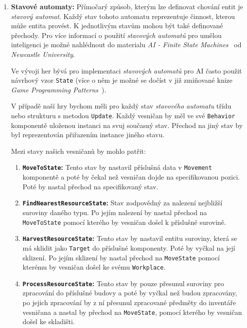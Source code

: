 \begin{enumerate}
    \item \textbf{Stavové automaty:} Přímočarý způsob, kterým lze definovat chování entit je \textit{stavový automat}. Každý stav tohoto automatu reprezentuje činnost, kterou může entita provést. K jednotlivým stavům mohou být také definované přechody. Pro více informací o použití \textit{stavových automatů} pro umělou inteligenci je možné nahlédnout do materialu \textit{AI - Finite State Machines}~\cite{AIStateMachines} od \textit{Newcastle University}.

    Ve vývoji her bývá pro implementaci \textit{stavových automatů} pro AI často použit návrhový vzor \texttt{State} (více o něm je možné se dočíst v již zmiňované knize \textit{Game Programming Patterns}~\cite{nystrom2014game}).

    V případě naší hry bychom měli pro každý stav \textit{stavového automatu} třídu nebo strukturu s metodou \texttt{Update}. Každý vesničan by měl ve své \texttt{Behavior} komponentě uloženou instanci na svuj současný stav. Přechod na jiný stav by byl reprezentován přiřazením instance jiného stavu.

    Mezi stavy našich vesničanů by mohlo patřit:
    \begin{enumerate}
        \item \textbf{\texttt{MoveToState}:} Tento stav by nastavil příslušná data v \texttt{Movement} komponentě a poté by čekal než vesničan dojde na specifikovanou pozici. Poté by nastal přechod na specifikovaný stav.

        \item \textbf{\texttt{FindNearestResourceState}:} Stav zodpovědný za nalezení nejbližší suroviny daného typu. Po jejím nalezení by nastal přechod na \texttt{MoveToState} pomocí kterého by vesničan došel k příslušné surovině.

        \item \textbf{\texttt{HarvestResourceState}:} Tento stav by nastavil entitu suroviny, která se má sklidit jako \texttt{Target} do příslušné komponenty. Poté by vyčkal na její sklizení. Po jejím sklizení by nastal přechod na \texttt{MoveState} pomocí kterému by vesničan došel ke svému \texttt{Workplace}.

        \item \textbf{\texttt{ProcessResourceState}:} Tento stav by pouze přesunul suroviny pro zpracování do příslušné budovy a poté by vyčkal než budou zpracovány, po jejich zpracování by z ní přesunul zpracované předměty do inventáře vesničana a nastal by přechod na \texttt{MoveState}, pomocí kterého by vesničan došel ke skladišti.


\end{enumerate}
\end{enumerate}
